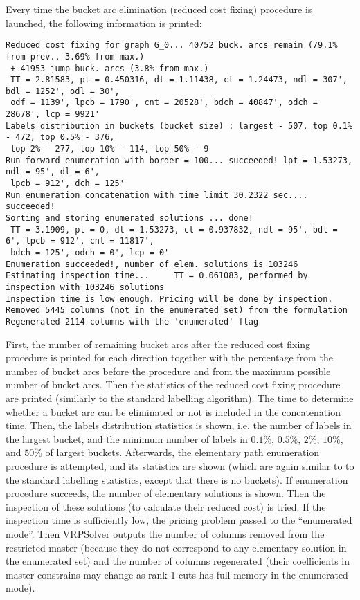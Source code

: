 \documentclass[10pt,a4paper]{article}
\begin{document}
\medskip
Every time the bucket arc elimination (reduced cost fixing) procedure is launched, the following information is
printed:
\scriptsize
\begin{verbatim}
Reduced cost fixing for graph G_0... 40752 buck. arcs remain (79.1% from prev., 3.69% from max.) 
 + 41953 jump buck. arcs (3.8% from max.)
 TT = 2.81583, pt = 0.450316, dt = 1.11438, ct = 1.24473, ndl = 307', bdl = 1252', odl = 30', 
 odf = 1139', lpcb = 1790', cnt = 20528', bdch = 40847', odch = 28678', lcp = 9921'
Labels distribution in buckets (bucket size) : largest - 507, top 0.1% - 472, top 0.5% - 376, 
 top 2% - 277, top 10% - 114, top 50% - 9
Run forward enumeration with border = 100... succeeded! lpt = 1.53273, ndl = 95', dl = 6', 
 lpcb = 912', dch = 125'
Run enumeration concatenation with time limit 30.2322 sec.... succeeded!
Sorting and storing enumerated solutions ... done!
 TT = 3.1909, pt = 0, dt = 1.53273, ct = 0.937832, ndl = 95', bdl = 6', lpcb = 912', cnt = 11817', 
 bdch = 125', odch = 0', lcp = 0'
Enumeration succeeded!, number of elem. solutions is 103246
Estimating inspection time...     TT = 0.061083, performed by inspection with 103246 solutions
Inspection time is low enough. Pricing will be done by inspection.
Removed 5445 columns (not in the enumerated set) from the formulation
Regenerated 2114 columns with the 'enumerated' flag
\end{verbatim}
\normalsize First, the number of remaining bucket arcs after the reduced cost fixing procedure is printed for each
direction together with the percentage from the number of bucket arcs before the procedure and from the maximum possible
number of bucket arcs. Then the statistics of the reduced cost fixing procedure are printed (similarly to the standard
labelling algorithm). The time to determine whether a bucket arc can be eliminated or not is included in the
concatenation time.  Then, the labels distribution statistics is shown, i.e. the number of labels in the largest bucket,
and the minimum number of labels in $0.1\%$, $0.5\%$, $2\%$, $10\%$, and $50\%$ of largest buckets. Afterwards, the
elementary path enumeration procedure is attempted, and its statistics are shown (which are again similar to to the
standard labelling statistics, except that there is no buckets). If enumeration procedure succeeds, the number of
elementary solutions is shown. Then the inspection of these solutions (to calculate their reduced cost) is tried. If the
inspection time is sufficiently low, the pricing problem passed to the ``enumerated mode''. Then VRPSolver outputs the
number of columns removed from the restricted master (because they do not correspond to any elementary solution in the
enumerated set) and the number of columns regenerated (their coefficients in master constrains may change as rank-1 cuts
has full memory in the enumerated mode).
\end{document}
